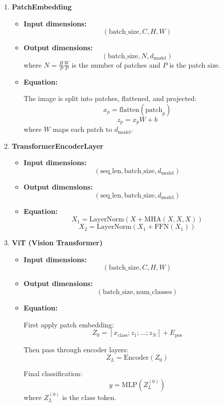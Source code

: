 \documentclass[10pt]{article}
\begin{document}
\begin{enumerate}[label=\roman*.]

\item \textbf{PatchEmbedding}

\begin{itemize}
    \item \textbf{Input dimensions:}
    \[
    (\text{batch\_size}, C, H, W)
    \]
    \item \textbf{Output dimensions:}
    \[
    (\text{batch\_size}, N, d_{\text{model}})
    \]
    where $N = \frac{H}{P}\frac{W}{P}$ is the number of patches and $P$ is the patch size.
    \item \textbf{Equation:}

    The image is split into patches, flattened, and projected:
    \[
    x_p = \text{flatten}(\text{patch}_p)
    \]
    \[
    z_p = x_p W + b
    \]
    where $W$ maps each patch to $d_{\text{model}}$.
\end{itemize}

\item \textbf{TransformerEncoderLayer}

\begin{itemize}
    \item \textbf{Input dimensions:}
    \[
    (\text{seq\_len}, \text{batch\_size}, d_{\text{model}})
    \]
    \item \textbf{Output dimensions:}
    \[
    (\text{seq\_len}, \text{batch\_size}, d_{\text{model}})
    \]
    \item \textbf{Equation:}
    \[
    X_1 = \mathrm{LayerNorm}(X + \mathrm{MHA}(X,X,X))
    \]
    \[
    X_2 = \mathrm{LayerNorm}(X_1 + \mathrm{FFN}(X_1))
    \]
\end{itemize}

\item \textbf{ViT (Vision Transformer)}

\begin{itemize}
    \item \textbf{Input dimensions:}
    \[
    (\text{batch\_size}, C, H, W)
    \]
    \item \textbf{Output dimensions:}
    \[
    (\text{batch\_size}, \text{num\_classes})
    \]
    \item \textbf{Equation:}

    First apply patch embedding:
    \[
    Z_0 = [x_{\text{class}}; z_1; \dots; z_N] + E_{\text{pos}}
    \]

    Then pass through encoder layers:
    \[
    Z_L = \mathrm{Encoder}(Z_0)
    \]

    Final classification:
    \[
    y = \mathrm{MLP}(Z_L^{(0)})
    \]
    where $Z_L^{(0)}$ is the class token.
\end{itemize}

\end{enumerate}
\end{document}
